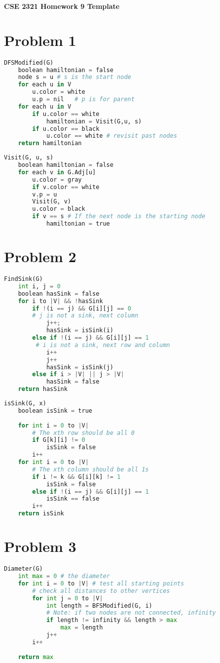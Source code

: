 \documentclass[14pt]{extarticle}
\begin{document}
\textbf{CSE 2321 Homework 9 Template}
\section*{Problem 1}

\begin{lstlisting}[language=Python]
DFSModified(G)
	boolean hamiltonian = false
	node s = u # s is the start node
	for each u in V
		u.color = white
		u.p = nil	# p is for parent
	for each u in V
		if u.color == white
			hamiltonian = Visit(G,u, s)
		if u.color == black
			u.color == white # revisit past nodes
	return hamiltonian
\end{lstlisting}

\begin{lstlisting}[language=Python]
Visit(G, u, s)
	boolean hamiltonian = false
	for each v in G.Adj[u]
		u.color = gray
		if v.color == white
		v.p = u
		Visit(G, v)
		u.color = black
		if v == s # If the next node is the starting node
			hamiltonian = true
\end{lstlisting}

\section*{Problem 2}
\begin{lstlisting}[language=Python]
FindSink(G) 
	int i, j = 0
	boolean hasSink = false
	for i to |V| && !hasSink
		if !(i == j) && G[i][j] == 0 
		# j is not a sink, next column
			j++;
			hasSink = isSink(i)
		else if !(i == j) && G[i][j] == 1 
		 # i is not a sink, next row and column
			i++
			j++
			hasSink = isSink(j)
		else if i > |V| || j > |V|
			hasSink = false
	return hasSink
\end{lstlisting}

\begin{lstlisting}[language=Python]
isSink(G, x) 
	boolean isSink = true
	
	for int i = 0 to |V|
		# The xth row should be all 0
		if G[k][i] != 0
			isSink = false
		i++
	for int i = 0 to |V|
		# The xth column should be all 1s
		if i != k && G[i][k] != 1 
			isSink = false
		else if !(i == j) && G[i][j] == 1 
			isSink == false
		i++	
	return isSink
\end{lstlisting}

\section*{Problem 3}
	\begin{lstlisting}[language=Python]
Diameter(G)
	int max = 0 # the diameter
	for int i = 0 to |V| # test all starting points
		# check all distances to other vertices
		for int j = 0 to |V| 
			int length = BFSModified(G, i)
			# Note: if two nodes are not connected, infinity
			if length != infinity && length > max 
				max = length
			j++
		i++
	
	return max
\end{lstlisting}
\end{document}

